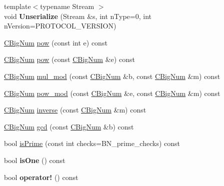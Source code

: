 \begin{DoxyCompactItemize}
\item 
\mbox{\label{class_c_big_num_aa70f21429cc04c2dbee78189c454bac2}} 
{\footnotesize template$<$typename Stream $>$ }\\void {\bfseries Unserialize} (Stream \&s, int n\+Type=0, int n\+Version=P\+R\+O\+T\+O\+C\+O\+L\+\_\+\+V\+E\+R\+S\+I\+ON)
\item 
\mbox{\hyperlink{class_c_big_num}{C\+Big\+Num}} \mbox{\hyperlink{class_c_big_num_aa8c79c0a8ca34ed34ef315047137ecc7}{pow}} (const int e) const
\item 
\mbox{\hyperlink{class_c_big_num}{C\+Big\+Num}} \mbox{\hyperlink{class_c_big_num_ad78d76fa6b5f7faad3b3966e22f3832e}{pow}} (const \mbox{\hyperlink{class_c_big_num}{C\+Big\+Num}} \&e) const
\item 
\mbox{\hyperlink{class_c_big_num}{C\+Big\+Num}} \mbox{\hyperlink{class_c_big_num_abf7973e872561306532d90386d325875}{mul\+\_\+mod}} (const \mbox{\hyperlink{class_c_big_num}{C\+Big\+Num}} \&b, const \mbox{\hyperlink{class_c_big_num}{C\+Big\+Num}} \&m) const
\item 
\mbox{\hyperlink{class_c_big_num}{C\+Big\+Num}} \mbox{\hyperlink{class_c_big_num_a949004e3f63921b28b4e245624854289}{pow\+\_\+mod}} (const \mbox{\hyperlink{class_c_big_num}{C\+Big\+Num}} \&e, const \mbox{\hyperlink{class_c_big_num}{C\+Big\+Num}} \&m) const
\item 
\mbox{\hyperlink{class_c_big_num}{C\+Big\+Num}} \mbox{\hyperlink{class_c_big_num_ace6cb4447751b27f00139d60dd8ebba4}{inverse}} (const \mbox{\hyperlink{class_c_big_num}{C\+Big\+Num}} \&m) const
\item 
\mbox{\hyperlink{class_c_big_num}{C\+Big\+Num}} \mbox{\hyperlink{class_c_big_num_a404a5797d26614e7854947e00d286d36}{gcd}} (const \mbox{\hyperlink{class_c_big_num}{C\+Big\+Num}} \&b) const
\item 
bool \mbox{\hyperlink{class_c_big_num_a6d51387c37d74d3c9dfe4fc7aa8affce}{is\+Prime}} (const int checks=B\+N\+\_\+prime\+\_\+checks) const
\item 
\mbox{\label{class_c_big_num_a0e237d40f4ea66b930b8136f77fd1349}} 
bool {\bfseries is\+One} () const
\item 
\mbox{\label{class_c_big_num_a913c8446faf36d6cfebf5dc88a7fef9a}} 
bool {\bfseries operator!} () const
\item 
\mbox{\label{class_c_big_num_ac3da33626c8ab06d6a049b310c086dd5}} 

\end{DoxyCompactItemize}
